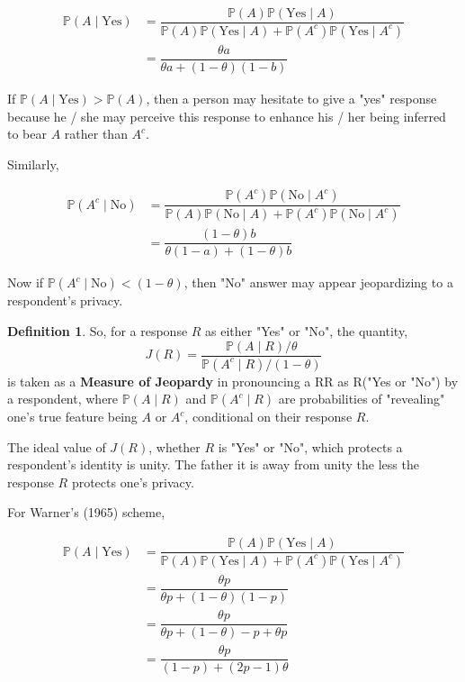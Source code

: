 \documentclass[12pt]{article}
\newcommand{\prob}{\mathbb{P}}
\theoremstyle{definition}
\newtheorem{defn}{Definition}
\newenvironment{definition}{
\begin{tcolorbox}[colback=green!5!white,colframe=green!75!black, parbox = false]\begin{defn} }{\end{defn}\end{tcolorbox} }
\begin{document}
\begin{align*}
    \prob(A \mid \text{Yes}) 
    & = \dfrac{\prob(A) \prob(\text{Yes}\mid A) }{\prob(A) \prob(\text{Yes}\mid A) + \prob(A^c) \prob(\text{Yes}\mid A^c)}\\
    & = \dfrac{\theta a}{\theta a + (1-\theta) (1-b)}
\end{align*}

If $\prob(A \mid \text{Yes}) > \prob(A)$, then a person may hesitate to give a "yes" response because he / she may perceive this response to enhance his / her being inferred to bear $A$ rather than $A^c$.

Similarly,

\begin{align*}
    \prob(A^c \mid \text{No}) 
    & = \dfrac{\prob(A^c) \prob(\text{No}\mid A^c) }{\prob(A) \prob(\text{No}\mid A) + \prob(A^c) \prob(\text{No}\mid A^c)}\\
    & = \dfrac{(1 - \theta) b}{\theta (1-a) + (1-\theta) b}
\end{align*}

Now if $\prob(A^c \mid \text{No}) < (1-\theta)$, then "No" answer may appear jeopardizing to a respondent's privacy.

\begin{definition}
    So, for a response $R$ as either "Yes" or "No", the quantity,
    $$J(R) = \dfrac{\prob(A\mid R)/\theta}{\prob(A^c \mid R)/(1-\theta)}$$
    is taken as a \textbf{Measure of Jeopardy} in pronouncing a RR as R("Yes or "No") by a respondent, where $\prob(A\mid R)$ and $\prob(A^c\mid R)$ are probabilities of "revealing" one's true feature being $A$ or $A^c$, conditional on their response $R$.
\end{definition}

The ideal value of $J(R)$, whether $R$ is "Yes" or "No", which protects a respondent's identity is unity. The father it is away from unity the less the response $R$ protects one's privacy.

For Warner's (1965) scheme, 

\begin{align*}
    \prob(A \mid \text{Yes}) 
    & = \dfrac{\prob(A) \prob(\text{Yes}\mid A) }{ \prob(A) \prob(\text{Yes}\mid A) + \prob(A^c) \prob(\text{Yes}\mid A^c) }\\
    & = \dfrac{\theta p}{\theta p + (1-\theta) (1-p)}\\
    & = \dfrac{\theta p}{ \theta p + (1 - \theta) - p + \theta p }\\
    & = \dfrac{\theta p}{(1 - p) + (2p - 1)\theta}
\end{align*}
\end{document}
